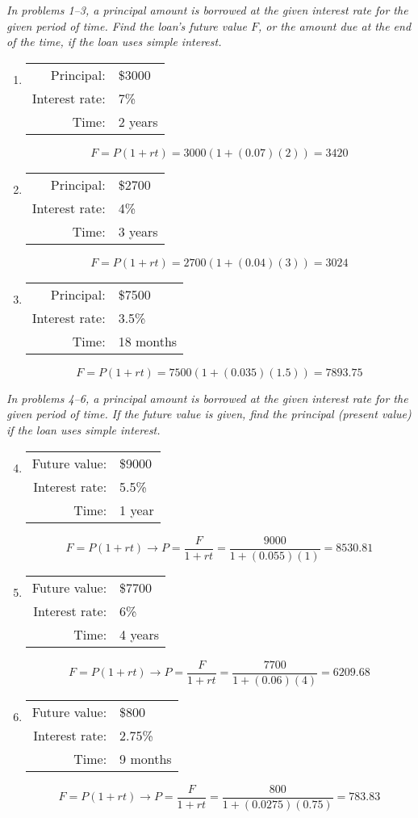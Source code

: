 \emph{In problems 1--3, a principal amount is borrowed at the given interest rate for the given period of time.  Find the loan's future value $F$, or the amount due at the end of the time, if the loan uses simple interest.}

\begin{enumerate}
\item \begin{tabular}{r l}
Principal: & \$3000\\
Interest rate: & 7\%\\
Time: & 2 years
\end{tabular} 
\[F = P(1 + rt) = 3000(1 + (0.07)(2)) = 3420\]

\item \begin{tabular}{r l}
Principal: & \$2700\\
Interest rate: & 4\%\\
Time: & 3 years
\end{tabular} 
\[F = P(1 + rt) = 2700(1 + (0.04)(3)) = 3024\]

\item \begin{tabular}{r l}
Principal: & \$7500\\
Interest rate: & 3.5\%\\
Time: & 18 months
\end{tabular} 
\[F = P(1 + rt) = 7500(1 + (0.035)(1.5)) = 7893.75\]
\end{enumerate}

\emph{In problems 4--6, a principal amount is borrowed at the given interest rate for the given period of time.  If the future value is given, find the principal (present value) if the loan uses simple interest.}

\begin{enumerate}
\setcounter{enumi}{3}
\item \begin{tabular}{r l}
Future value: & \$9000\\
Interest rate: & 5.5\%\\
Time: & 1 year
\end{tabular} 
\[F = P(1 + rt) \longrightarrow P = \dfrac{F}{1+rt} = \dfrac{9000}{1 + (0.055)(1)} = 8530.81\]

\item \begin{tabular}{r l}
Future value: & \$7700\\
Interest rate: & 6\%\\
Time: & 4 years
\end{tabular} 
\[F = P(1 + rt) \longrightarrow P = \dfrac{F}{1+rt} = \dfrac{7700}{1 + (0.06)(4)} = 6209.68\]

\item \begin{tabular}{r l}
Future value: & \$800\\
Interest rate: & 2.75\%\\
Time: & 9 months
\end{tabular} 
\[F = P(1 + rt) \longrightarrow P = \dfrac{F}{1+rt} = \dfrac{800}{1 + (0.0275)(0.75)} = 783.83\]
\end{enumerate}

